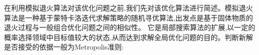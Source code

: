 在利用模拟退火算法对该优化问题之前,我们先对该优化算法进行简述。模拟退火算法是一种基于蒙特卡洛迭代求解策略的随机寻优算法,出发点是基于固体物质的退火过程与一般组合优化问题之间的相似性。
它是局部搜索算法的扩展,以一定的概率选择领域中目标值较大的状态,从而达到求解全局优化问题的目的。判断新解是否接受的依据一般为Metropolis准则:
